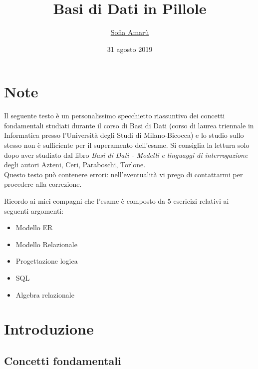\documentclass[a4paper]{article}
\begin{document}
\title{Basi di Dati in Pillole}
\date{31 agosto 2019}
\author{\href{https://t.me/amarusofia}{Sofia Amarù}}
\maketitle
\tableofcontents\par \section*{Note}
Il seguente testo è un personalissimo specchietto riassuntivo dei concetti fondamentali studiati durante il corso di Basi di Dati (corso di laurea triennale in Informatica presso l'Università degli Studi di Milano-Bicocca) e lo studio sullo stesso non è sufficiente per il superamento dell'esame. Si consiglia la lettura solo dopo aver studiato dal libro \emph{Basi di Dati - Modelli e linguaggi di interrogazione} degli autori Azteni, Ceri, Paraboschi, Torlone.\medskip\\
Questo testo può contenere errori: nell'eventualità vi prego di contattarmi per procedere alla correzione.\medskip\\\par Ricordo ai miei compagni che l'esame è composto da 5 esericizi relativi ai seguenti argomenti:
\begin{itemize}[leftmargin=*, noitemsep]
  \item Modello ER
  \item Modello Relazionale
  \item Progettazione logica
  \item SQL
  \item Algebra relazionale
\end{itemize}\par \section{Introduzione}
\subsection{Concetti fondamentali}
\end{document}
